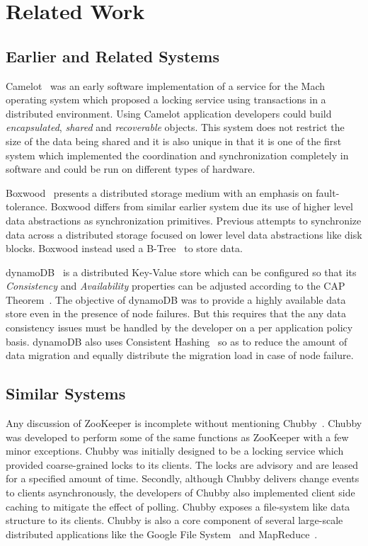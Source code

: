 \chapter{Related Work}
\section{Earlier and Related Systems}
Camelot~\cite{hastings1990distributed} was an early software implementation of a service for the Mach operating system which proposed a locking service using transactions in a distributed environment. Using Camelot application developers could build \textit{encapsulated}, \textit{shared} and \textit{recoverable} objects. This system does not restrict the size of the data being shared and it is also unique in that it is one of the first system which implemented the coordination and synchronization completely in software and could be run on different types of hardware.

Boxwood~\cite{maccormick2004boxwood} presents a distributed storage medium with an emphasis on fault-tolerance. Boxwood differs from similar earlier system due its use of higher level data abstractions as synchronization primitives. Previous attempts to synchronize data across a distributed storage focused on lower level data abstractions like disk blocks. Boxwood instead used a B-Tree~\cite{skiena504algorithm} to store data.

dynamoDB~\cite{decandia2007dynamo} is a distributed Key-Value store which can be configured so that its \textit{Consistency} and \textit{Availability} properties can be adjusted according to the CAP Theorem~\cite{Gilbert:2002:BCF:564585.564601}. The objective of dynamoDB was to provide a highly available data store even in the presence of node failures. But this requires that the any data consistency issues must be handled by the developer on a per application policy basis. dynamoDB also uses Consistent Hashing~\cite{Karger:1997:CHR:258533.258660} so as to reduce the amount of data migration and equally distribute the migration load in case of node failure. 

\section{Similar Systems}
Any discussion of ZooKeeper is incomplete without mentioning Chubby~\cite{burrows2006chubby}. Chubby was developed to perform some of the same functions as ZooKeeper with a few minor exceptions. Chubby was initially designed to be a locking service which provided coarse-grained locks to its clients. The locks are advisory and are leased for a specified amount of time. Secondly, although Chubby delivers change events to clients asynchronously, the developers of Chubby also implemented client side caching to mitigate the effect of polling. Chubby exposes a file-system like data structure to its clients. Chubby is also a core component of several large-scale distributed applications like the Google File System~\cite{Ghemawat:2003:GFS:945445.945450} and MapReduce~\cite{Dean:2008:MSD:1327452.1327492}.

